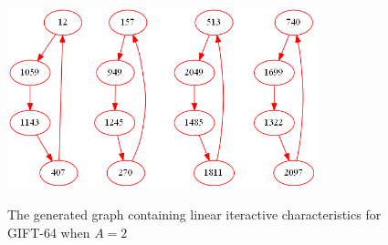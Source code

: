 \begin{figure}[htbp]
{	\label{fig:graph-rect-lat2}
	}
	\quad
	\quad
\end{figure}

\begin{figure}
    \centering
	\caption{The generated graph containing linear iteractive characteristics for GIFT-64 when $A=2$}
	\includegraphics[width=0.8\textwidth]{fig/graph_gift64_lat2.png}
	\label{fig:graph-gift64-lat2}
\end{figure}

